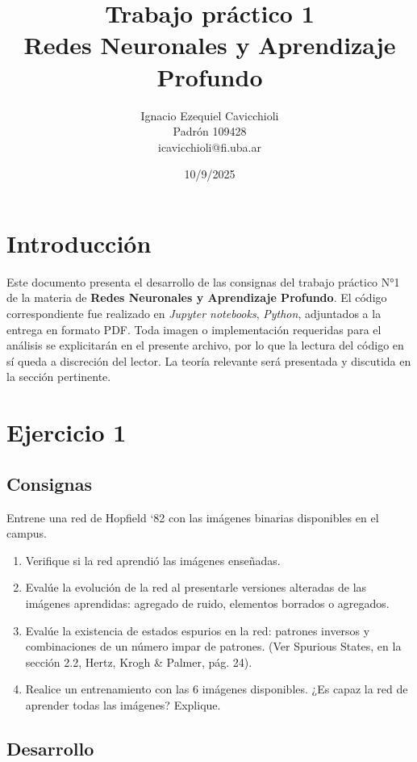 \documentclass[11pt]{article} %
\title{Trabajo práctico 1\\ Redes Neuronales y Aprendizaje Profundo}
\author{Ignacio Ezequiel Cavicchioli\\Padrón 109428\\icavicchioli@fi.uba.ar}
\date{10/9/2025} %
\begin{document}
\maketitle

\tableofcontents



\section{Introducción}

Este documento presenta el desarrollo de las consignas del trabajo práctico N°1 de la materia de \textbf{Redes Neuronales y Aprendizaje Profundo}.  El código correspondiente fue realizado en  \textit{Jupyter notebooks}, \textit{Python}, adjuntados a la entrega en formato PDF. Toda imagen o implementación requeridas para el análisis se explicitarán en el presente archivo, por lo que la lectura del código en sí queda a discreción del lector. La teoría relevante será presentada y discutida en la sección pertinente.

\newpage

\section{Ejercicio 1}

\subsection{Consignas}
Entrene una red de Hopfield ‘82 con las imágenes binarias disponibles en el campus. 
\begin{enumerate}[label=\alph*]
\item Verifique si la red aprendió las imágenes enseñadas.
\item Evalúe la evolución de la red al presentarle versiones alteradas de las imágenes
aprendidas: agregado de ruido, elementos borrados o agregados.
\item Evalúe la existencia de estados espurios en la red: patrones inversos y
combinaciones de un número impar de patrones. (Ver Spurious States, en la sección
2.2, Hertz, Krogh \& Palmer, pág. 24).
\item Realice un entrenamiento con las 6 imágenes disponibles. ¿Es capaz la red de
aprender todas las imágenes? Explique.
\end{enumerate}

\subsection{Desarrollo}
\end{document}
